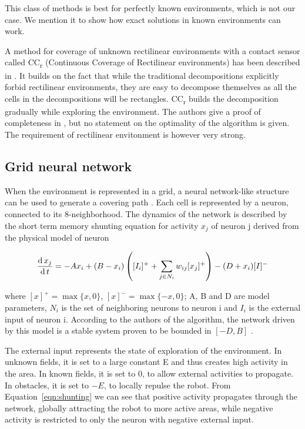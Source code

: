 \documentclass[buriama8_dp.tex]{subfiles}
\begin{document}
This class of methods is best for perfectly known environments, which is not our case. We mention it to show how exact solutions in known environments can work.

\def\CCr{CC\textsubscript{r} }
A method for coverage of unknown rectilinear environments with a contact sensor called \CCr  (Continuous Coverage of Rectilinear environments) has been described in \cite{ccrpaper}. It builds on the fact that while the traditional decompositions explicitly forbid rectilinear environments, they are easy to decompose themselves as all the cells in the decompositions will be rectangles. \CCr builds the decomposition gradually while exploring the environment. The authors give a proof of completeness in \cite{ccrpaper}, but no statement on the optimality of the algorithm is given. The requirement of rectilinear envitonment is however very strong.


\subsection{Grid neural network}
\label{subsec:nncpp}
When the environment is represented in a grid, a neural network-like structure can be used to generate a covering path \cite{neural}. Each cell is represented by a neuron, connected to its 8-neighborhood. The dynamics of the network is described by the short term memory shunting equation for activity \(x_j\) of neuron \m j derived from the physical model of neuron \cite[sec.~III]{neural}
 
\begin{equation}
  \frac{\textrm{d}\, x_j}{\textrm{d}\, t} = -Ax_i + (B-x_i) \left( [I_i]^+ + \sum_{j \in N_i} w_{ij}[x_j]^+ \right) - (D+x_i)[I]^-
\label{eqn:shunting}
\end{equation}

\noindent where \([x]^+=\max\{x,0\}\), \([x]^-=\max\{-x,0\}\); \m A, \m B and \m D are model parameters, \(N_i\) is the set of neighboring neurons to neuron \m i and \(I_i\) is the external input of neuron \m i. According to the authors of the algorithm, the network driven by this model is a stable system proven to be bounded in \([-D,B]\) \cite{grossbergmodel}.

The external input represents the state of exploration of the environment. In unknown fields, it is set to a large constant \m E and thus creates high activity in the area. In known fields, it is set to 0, to allow external activities to propagate. In obstacles, it is set to \(-E\), to locally repulse the robot. From Equation~\ref{eqn:shunting} we can see that positive activity propagates through the network, globally attracting the robot to more active areas, while negative activity is restricted to only the neuron with negative external input.
\end{document}
